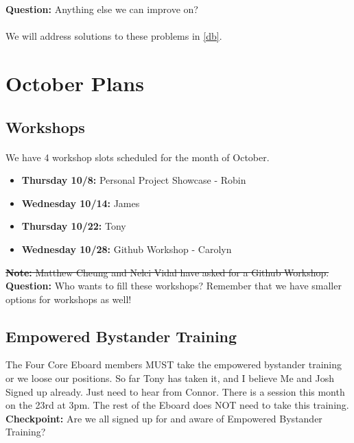 \documentclass{article}
\begin{document}
\textbf{Question:} Anything else we can improve on?

\paragraph{}
We will address solutions to these problems in \ref{db}.

\section{October Plans}

\subsection{Workshops}
\paragraph{}
We have 4 workshop slots scheduled for the month of October.
\begin{itemize}
    \item \textbf{Thursday 10/8:} Personal Project Showcase - Robin
    \item \textbf{Wednesday 10/14:} James
    \item \textbf{Thursday 10/22:} Tony
    \item \textbf{Wednesday 10/28:} Github Workshop - Carolyn
\end{itemize}

\noindent
\sout{\textbf{Note:} Matthew Cheung and Nelci Vidal have asked for a Github Workshop.}
\newline\newline
\textbf{Question:} Who wants to fill these workshops? Remember that we have smaller options for workshops as well! 

\subsection{Empowered Bystander Training}
The Four Core Eboard members MUST take the empowered bystander training or we loose our positions. So far Tony has taken it, and I believe Me and Josh Signed up already. Just need to hear from Connor. There is a session this month on the 23rd at 3pm. The rest of the Eboard does NOT need to take this training. 
\newline
\newline
\noindent
\textbf{Checkpoint:} Are we all signed up for and aware of Empowered Bystander Training?
\end{document}
